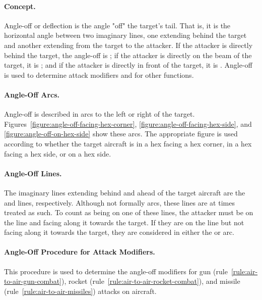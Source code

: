 {

}{

\paragraph{Concept.} Angle-off or deflection is the angle "off" the target's tail. That is, it is the horizontal angle between two imaginary lines, one extending behind the target and another extending from the target to the attacker. If the attacker is directly behind the target, the angle-off is ; if the attacker is directly on the beam of the target, it is ; and if the attacker is directly in front of the target, it is . Angle-off is used to determine attack modifiers and for other functions. 

\paragraph{Angle-Off Arcs.} Angle-off is described in  arcs to the left or right of the target. Figures~\ref{figure:angle-off-facing-hex-corner}, \ref{figure:angle-off-facing-hex-side}, and \ref{figure:angle-off-on-hex-side} show these arcs. The appropriate figure is used according to whether the target aircraft is in a hex facing a hex corner, in a hex facing a hex side, or on a hex side.

\paragraph{Angle-Off Lines.} The imaginary lines extending behind and ahead of the target aircraft are the  and  lines, respectively. Although not formally arcs, these lines are at times treated as such. To count as being on one of these lines, the attacker must be on the line and facing along it towards the target. If they are on the line but not facing along it towards the target, they are considered in either the  or  arc.

\paragraph{Angle-Off Procedure for Attack Modifiers.}
This procedure is used to determine the angle-off modifiers for gun (rule~\ref{rule:air-to-air-gun-combat}), rocket (rule~\ref{rule:air-to-air-rocket-combat}), and missile (rule~\ref{rule:air-to-air-missiles}) attacks on aircraft.

}
